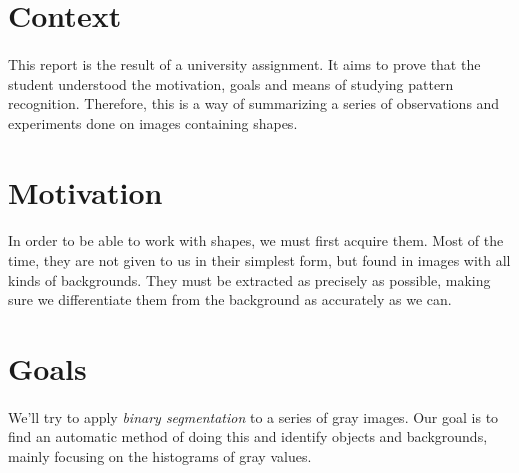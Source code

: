 \section{Context}
\paragraph{}
This report is the result of a university assignment.
It aims to prove that the student understood the motivation, goals and means of studying pattern recognition.
Therefore, this is a way of summarizing a series of observations and experiments done on images containing shapes.

\section{Motivation}
\paragraph{}
In order to be able to work with shapes, we must first acquire them.
Most of the time, they are not given to us in their simplest form, but found in images with all kinds of backgrounds.
They must be extracted as precisely as possible, making sure we differentiate them from the background as accurately as we can.

\section{Goals}
\paragraph{}
We'll try to apply \emph{binary segmentation} to a series of gray images.
Our goal is to find an automatic method of doing this and identify objects and backgrounds, mainly focusing on the histograms of gray values.

